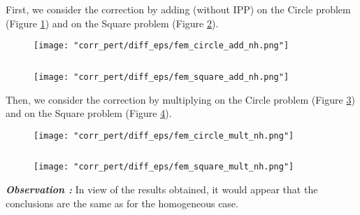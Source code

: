 \begin{enumerate}[label=\textbullet]
	First, we consider the correction by adding (without IPP) on the Circle problem (Figure \ref{corr_pert_fem_circle_add_nh}) and on the Square problem (Figure \ref{corr_pert_fem_square_add_nh}).
	
	\begin{minipage}{0.48\linewidth}
		\begin{figure}[H]
			\centering
			\texttt{[image: "corr\_pert/diff\_eps/fem\_circle\_add\_nh.png"]}
			\label{corr_pert_fem_circle_add_nh}
		\end{figure} 
	\end{minipage} $\qquad$
	\begin{minipage}{0.48\linewidth}
		\begin{figure}[H]
			\centering
			\texttt{[image: "corr\_pert/diff\_eps/fem\_square\_add\_nh.png"]}
			\label{corr_pert_fem_square_add_nh}
		\end{figure} 
	\end{minipage}
	
	Then, we consider the correction by multiplying on the Circle problem (Figure \ref{corr_pert_fem_circle_mult_nh}) and on the Square problem (Figure \ref{corr_pert_fem_square_mult_nh}).
	
	\begin{minipage}{0.48\linewidth}
		\begin{figure}[H]
			\centering
			\texttt{[image: "corr\_pert/diff\_eps/fem\_circle\_mult\_nh.png"]}
			\label{corr_pert_fem_circle_mult_nh}
		\end{figure} 
	\end{minipage} $\qquad$
	\begin{minipage}{0.48\linewidth}
		\begin{figure}[H]
			\centering
			\texttt{[image: "corr\_pert/diff\_eps/fem\_square\_mult\_nh.png"]}
			\label{corr_pert_fem_square_mult_nh}
		\end{figure} 
	\end{minipage}
	
	\textbf{\textit{Observation :}} In view of the results obtained, it would appear that the conclusions are the same as for the homogeneous case.
\end{enumerate}

